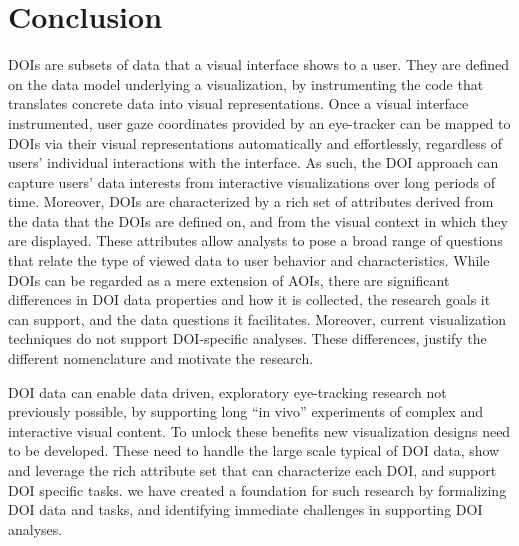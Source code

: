 \section{Conclusion}
\label{sec:DOIAnalysisModelConclusion}
DOIs are subsets of data that a visual interface shows to a user. They are defined on the data model underlying a visualization, by instrumenting the code that translates concrete data into visual representations. Once a visual interface instrumented, user gaze coordinates provided by an eye-tracker can be mapped to DOIs via their visual representations automatically and effortlessly, regardless of users' individual interactions with the interface. As such, the DOI approach can capture users' data interests from interactive visualizations over long periods of time. Moreover, DOIs are characterized by a rich set of attributes derived from the data that the DOIs are defined on, and from the visual context in which they are displayed. These attributes allow analysts to pose a broad range of questions that relate the type of viewed data to user behavior and characteristics. While DOIs can be regarded as a mere extension of AOIs, there are significant differences in DOI data properties and how it is collected, the research goals it can support, and the data questions it facilitates. Moreover, current visualization techniques do not support DOI-specific analyses. These differences, justify the different nomenclature and motivate the research.    

DOI data can enable data driven, exploratory eye-tracking research not previously possible, by supporting long ``in vivo'' experiments of complex and interactive visual content. To unlock these benefits new visualization designs need to be developed. These need to handle the large scale typical of DOI data, show and leverage the rich attribute set that can characterize each DOI, and support DOI specific tasks. we have created a foundation for such research by formalizing DOI data and tasks, and identifying immediate challenges in supporting DOI analyses.